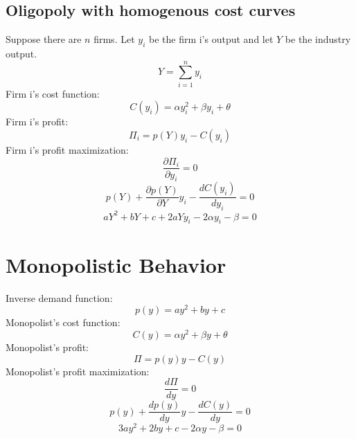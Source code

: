 \documentclass[11pt, a4paper]{article}
\begin{document}
\subsection{Oligopoly with homogenous cost curves}

Suppose there are $n$ firms. Let $y_{i}$ be the firm i's output and let $Y$ be the industry output.
\begin{equation*}
	Y = \sum_{i = 1}^{n}y_{i}
\end{equation*}
Firm i's cost function:
\begin{equation*}
	C(y_{i}) = \alpha y_{i}^2 + \beta y_{i} + \theta
\end{equation*}
Firm i's profit:
\begin{equation*}
	\Pi _{i} = p(Y)y_{i} - C(y_{i})
\end{equation*}
Firm i's profit maximization:
\begin{equation*}
	\frac{\partial \Pi_{i}}{\partial y_{i}} = 0
\end{equation*}
\begin{equation*}
	p(Y) + \frac{\partial p(Y)}{\partial Y}y_{i} - \frac{dC(y_{i})}{dy_{i}} = 0
\end{equation*}
\begin{equation*}
	aY^2 + bY + c + 2aYy_{i} - 2\alpha y_{i} - \beta = 0
\end{equation*}

\section{Monopolistic Behavior}

Inverse demand function:
\begin{equation*}
	p(y) = ay^2 + by  + c
\end{equation*}
Monopolist's cost function:
\begin{equation*}
	C(y) = \alpha y^2 + \beta y + \theta
\end{equation*}
Monopolist's profit:
\begin{equation*}
	\Pi = p(y)y - C(y)
\end{equation*}
Monopolist's profit maximization:
\begin{equation*}
	\frac{d\Pi}{dy} = 0
\end{equation*}
\begin{equation*}
	p(y) + \frac{dp(y)}{dy}y - \frac{dC(y)}{dy} = 0
\end{equation*}
\begin{equation*}
	3ay^2 + 2by + c - 2\alpha y - \beta= 0
\end{equation*}
\end{document}
